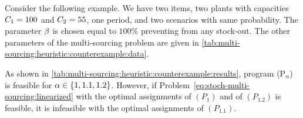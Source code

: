 Consider the following example.
We have two items, two plants with capacities $C_1=100$ and $C_2=55$, one period, and two scenarios with same probability.
The parameter $\beta$ is chosen equal to $100\%$ preventing from any stock-out.
The other parameters of the multi-sourcing problem are given in \cref{tab:multi-sourcing:heuristic:counterexample:data}.
\begin{table}[h]
\hfill
{}
\hfill
{}
\caption{Parameters of the counterexample}
\label{tab:multi-sourcing:heuristic:counterexample:data}
\end{table}


As shown in \cref{tab:multi-sourcing:heuristic:counterexample:results}, program (P$_{\alpha}$) is feasible for $\alpha\in\crbracket{1,1.1,1.2}$. However, if Problem~\eqref{eq:stoch-multi-sourcing:linearized} with the optimal assignments of $(P_{1})$ and of $(P_{1.2})$ is feasible, it is infeasible with the optimal assignments of $(P_{1.1})$.


